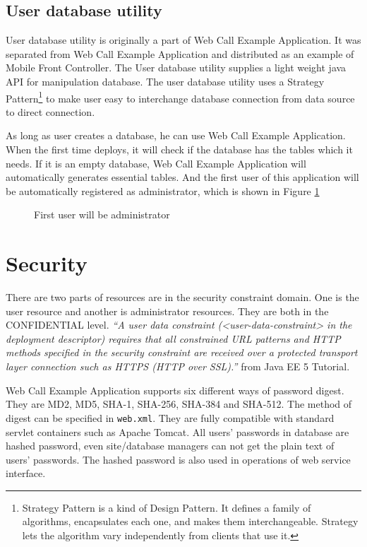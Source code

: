 \subsection{User database utility}
\label{sec:WebApplication:Database:UserDatabaseUtility}

User database utility is originally a part of Web Call Example Application. It was separated from Web Call Example Application and distributed as an example of Mobile Front Controller. The User database utility supplies a light weight java API for manipulation database. The user database utility uses a Strategy Pattern\footnote{Strategy Pattern is a kind of Design Pattern. It defines a family of algorithms, encapsulates each one, and makes them interchangeable. Strategy lets the algorithm vary independently from clients that use it.} to make user easy to interchange database connection from data source to direct connection. 

As long as user creates a database, he can use Web Call Example Application. When the first time deploys, it will check if the database has the tables which it needs. If it is an empty database, Web Call Example Application will automatically generates essential tables. And the first user of this application will be automatically registered as administrator, which is shown in Figure \ref{fig:FirstUser}

\begin{figure}[!hbtp]
\centering
{}
\caption{First user will be administrator}
\label{fig:FirstUser}
\end{figure} 

\section{Security}
\label{sec:WebApplication:Security}

There are two parts of resources are in the security constraint domain. One is the user resource and another is administrator resources. They are both in the CONFIDENTIAL level. \textit{``A user data constraint (<user-data-constraint> in the deployment descriptor) requires that all constrained URL patterns and HTTP methods specified in the security constraint are received over a protected transport layer connection such as HTTPS (HTTP over SSL).''} from Java EE 5 Tutorial\cite{JavaEE5Tutorial}.  

Web Call Example Application supports six different ways of password digest. They are MD2, MD5, SHA-1, SHA-256, SHA-384 and SHA-512. The method of digest can be specified in \texttt{web.xml}. They are fully compatible with standard servlet containers such as \textsf{Apache Tomcat}. All users' passwords in database are hashed password, even site/database managers can not get the plain text of users' passwords. The hashed password is also used in operations of web service interface. 


